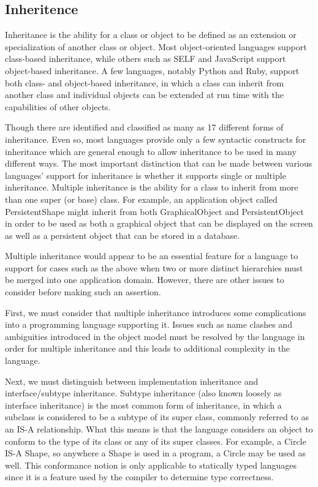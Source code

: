 \documentclass[12pt,a4paper,final,twoside,onecolumn,titlepage]{book}
\begin{document}
\subsection{Inheritence}
Inheritance is the ability for a class or object to be defined as an extension or specialization of another class or object. Most object-oriented languages support class-based inheritance, while others such as SELF and JavaScript support object-based inheritance. A few languages, notably Python and Ruby, support both class- and object-based inheritance, in which a class can inherit from another class and individual objects can be extended at run time with the capabilities of other objects. 

Though there are identified and classified as many as 17 different forms of inheritance. Even so, most languages provide only a few syntactic constructs for inheritance which are general enough to allow inheritance to be used in many different ways. The most important distinction that can be made between various languages' support for inheritance is whether it supports single or multiple inheritance. Multiple inheritance is the ability for a class to inherit from more than one super (or base) class. For example, an application object called PersistentShape might inherit from both GraphicalObject and PersistentObject in order to be used as both a graphical object that can be displayed on the screen as well as a persistent object that can be stored in a database.

Multiple inheritance would appear to be an essential feature for a language to support for cases such as the above when two or more distinct hierarchies must be merged into one application domain. However, there are other issues to consider before making such an assertion.

First, we must consider that multiple inheritance introduces some complications into a programming language supporting it. Issues such as name clashes and ambiguities introduced in the object model must be resolved by the language in order for multiple inheritance and this leads to additional complexity in the language. 

Next, we must distinguish between implementation inheritance and interface/subtype inheritance. Subtype inheritance (also known loosely as interface inheritance) is the most common form of inheritance, in which a subclass is considered to be a subtype of its super class, commonly referred to as an IS-A relationship. What this means is that the language considers an object to conform to the type of its class or any of its super classes. For example, a Circle IS-A Shape, so anywhere a Shape is used in a program, a Circle may be used as well. This conformance notion is only applicable to statically typed languages since it is a feature used by the compiler to determine type correctness.
\end{document}
